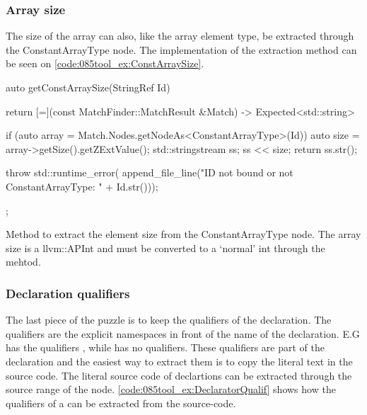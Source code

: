 \subsubsection*{Array size}

The size of the array can also, like the array element type, be extracted through the ConstantArrayType node. The implementation of the extraction method can be seen on \cref{code:085tool_ex:ConstArraySize}.

\begin{listing}[H]
    \begin{cppcode}
auto getConstArraySize(StringRef Id) {
    return [=](const MatchFinder::MatchResult &Match) -> Expected<std::string> {
        if (auto array = Match.Nodes.getNodeAs<ConstantArrayType>(Id)) {
            auto size = array->getSize().getZExtValue();
            std::stringstream ss;
            ss << size;
            return ss.str();
        }

        throw std::runtime_error(
			    append_file_line("ID not bound or not ConstantArrayType: " + Id.str()));
    };
}
    \end{cppcode}
    \caption{Method to extract the element size from the ConstantArrayType node. The array size is a llvm::APInt and must be converted to a `normal' int through the  mehtod.}
    \label{code:085tool_ex:ConstArraySize}
\end{listing}

\subsubsection*{Declaration qualifiers}

The last piece of the puzzle is to keep the qualifiers of the declaration. The qualifiers are the explicit namespaces in front of the name of the declaration. E.G   has the qualifiers , while  has no qualifiers. These qualifiers are part of the declaration and the easiest way to extract them is to copy the literal text in the source code. The literal source code of declartions can be extracted through the source range of the node. \cref{code:085tool_ex:DeclaratorQualif} shows how the qualifiers of a  can be extracted from the source-code.

